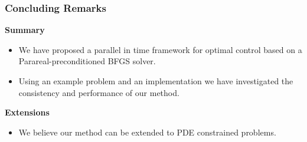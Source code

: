 \documentclass[9pt]{beamer}
\begin{document}
\begin{frame}
\frametitle{Concluding Remarks}
\textbf{Summary}
\begin{itemize}
\item{We have proposed a parallel in time framework for optimal control based on a Parareal-preconditioned BFGS solver.}
\item{Using an example problem and an implementation we have investigated the consistency and performance of our method.}
\end{itemize}
\textbf{Extensions}
\begin{itemize}
\item{We believe our method can be extended to PDE constrained problems.}
\end{itemize}
\begin{columns}
\end{columns}
\end{frame}
\end{document}
